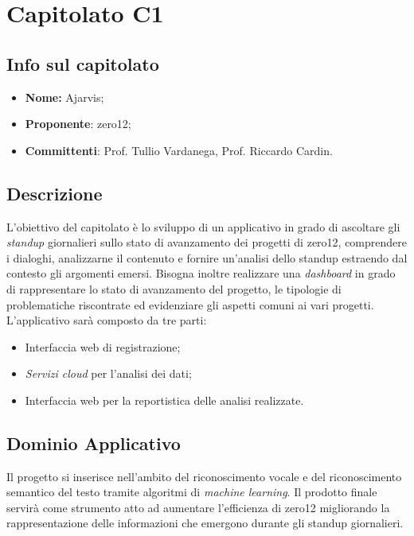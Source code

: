 \section{Capitolato C1}
\subsection{Info sul capitolato}
\begin{itemize}
	\item \textbf{Nome:} Ajarvis;
	\item \textbf{Proponente}: zero12;
	\item \textbf{Committenti}: Prof. Tullio Vardanega, Prof. Riccardo Cardin.
\end{itemize}

\subsection{Descrizione}
L'obiettivo del capitolato è lo sviluppo di un applicativo in grado di ascoltare gli \textit{standup} giornalieri sullo stato di avanzamento dei progetti di zero12, comprendere i dialoghi, analizzarne il contenuto e fornire un'analisi dello standup estraendo dal contesto gli argomenti emersi. Bisogna inoltre realizzare una \textit{dashboard} in grado di rappresentare lo stato di avanzamento del progetto, le tipologie di problematiche riscontrate ed evidenziare gli aspetti comuni ai vari progetti.
\\
L'applicativo sarà composto da tre parti:
\begin{itemize}
	\item Interfaccia web di registrazione;
	\item \textit{Servizi cloud} per l'analisi dei dati;
	\item Interfaccia web per la reportistica delle analisi realizzate.
\end{itemize}

\subsection{Dominio Applicativo}
Il progetto si inserisce nell'ambito del riconoscimento vocale e del riconoscimento semantico del testo tramite algoritmi di \textit{machine learning}. Il prodotto finale servirà come strumento atto ad aumentare l'efficienza di zero12 migliorando la rappresentazione delle informazioni che emergono durante gli standup giornalieri.

